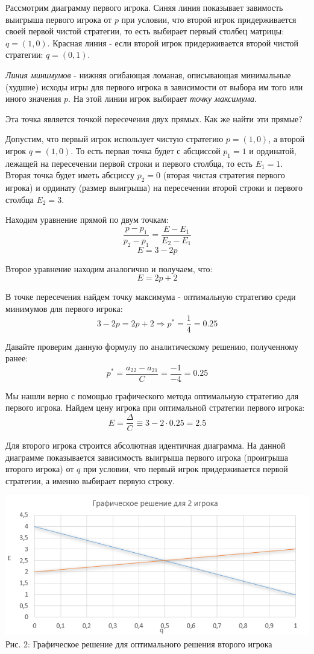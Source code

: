 \documentclass[aps,%
12pt,%
final,%
oneside,
onecolumn,%
musixtex, %
superscriptaddress,%
centertags]{article} %
\theoremstyle{plain}
\theoremstyle{definition}
\theoremstyle{remark}
\begin{document}
Рассмотрим диаграмму первого игрока. Синяя линия показывает завимость выигрыша первого игрока от $p$ при условии, что второй игрок придерживается своей первой чистой стратегии, то есть выбирает первый столбец матрицы: $q=(1,0)$. Красная линия - если второй игрок придерживается второй чистой стратегии: $q=(0,1)$.

\textit{Линия минимумов} - нижняя огибающая ломаная, описывающая минимальные (худшие) исходы игры для первого игрока в зависимости от выбора им того или иного значения $p$. На этой линии игрок выбирает \textit{точку максимума}.

Эта точка является точкой пересечения двух прямых. Как же найти эти прямые?

Допустим, что первый игрок использует чистую стратегию $p=(1,0)$, а второй игрок $q=(1,0)$. То есть первая точка будет с абсциссой $p_1=1$ и ординатой, лежащей на пересечении первой строки и первого столбца, то есть $E_1 = 1$. Вторая точка будет иметь абсциссу $p_2=0$ (вторая чистая стратегия первого игрока) и ординату (размер выигрыша) на пересечении второй строки и первого столбца $E_2 = 3$.

Находим уравнение прямой по двум точкам:
$$\frac{p-p_1}{p_2-p_1} = \frac{E-E_1}{E_2-E_1}$$
$$E = 3 - 2p$$

Второе уравнение находим аналогично и получаем, что:
$$E = 2p + 2$$

В точке пересечения найдем точку максимума - оптимальную стратегию среди минимумов для первого игрока:
$$3-2p = 2p+2 \Rightarrow p^* = \frac{1}{4} = 0.25$$

Давайте проверим данную формулу по аналитическому решению, полученному ранее:
$$p^{*} = \frac {a_{22}-a_{21}}{C} = \frac{-1}{-4} = 0.25$$

Мы нашли верно с помощью графического метода оптимальную стратегию для первого игрока. Найдем цену игрока при оптимальной стратегии первого игрока:
$$E = \frac{\Delta}{C} \equiv 3 - 2 \cdot 0.25 = 2.5$$

Для второго игрока строится абсолютная идентичная диаграмма. На данной диаграмме показывается зависимость выигрыша первого игрока (проигрыша второго игрока) от $q$ при условии, что первый игрок придерживается первой стратегии, а именно выбирает первую строку.

\begin{center}
  \includegraphics[scale=0.6]{images/2.png}
  Рис. 2: Графическое решение для оптимального решения второго игрока
\end{center}
\end{document}

